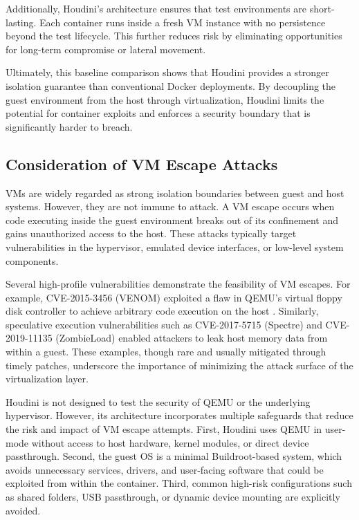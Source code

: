 \begin{doublespace}
Additionally, Houdini’s architecture ensures that test environments are short-lasting. Each container runs inside a fresh VM instance with no persistence beyond the test lifecycle. This further reduces risk by eliminating opportunities for long-term compromise or lateral movement.

Ultimately, this baseline comparison shows that Houdini provides a stronger isolation guarantee than conventional Docker deployments. By decoupling the guest environment from the host through virtualization, Houdini limits the potential for container exploits and enforces a security boundary that is significantly harder to breach.

\subsection{Consideration of VM Escape Attacks}

VMs are widely regarded as strong isolation boundaries between guest and host systems. However, they are not immune to attack. A VM escape occurs when code executing inside the guest environment breaks out of its confinement and gains unauthorized access to the host. These attacks typically target vulnerabilities in the hypervisor, emulated device interfaces, or low-level system components.

Several high-profile vulnerabilities demonstrate the feasibility of VM escapes. For example, CVE-2015-3456 (VENOM) exploited a flaw in QEMU's virtual floppy disk controller to achieve arbitrary code execution on the host \cite{venom}. Similarly, speculative execution vulnerabilities such as CVE-2017-5715 (Spectre) \cite{spectre} and CVE-2019-11135 (ZombieLoad) \cite{zombieload} enabled attackers to leak host memory data from within a guest. These examples, though rare and usually mitigated through timely patches, underscore the importance of minimizing the attack surface of the virtualization layer.

Houdini is not designed to test the security of QEMU or the underlying hypervisor. However, its architecture incorporates multiple safeguards that reduce the risk and impact of VM escape attempts. First, Houdini uses QEMU in user-mode without access to host hardware, kernel modules, or direct device passthrough. Second, the guest OS is a minimal Buildroot-based system, which avoids unnecessary services, drivers, and user-facing software that could be exploited from within the container. Third, common high-risk configurations such as shared folders, USB passthrough, or dynamic device mounting are explicitly avoided.


\end{doublespace}
